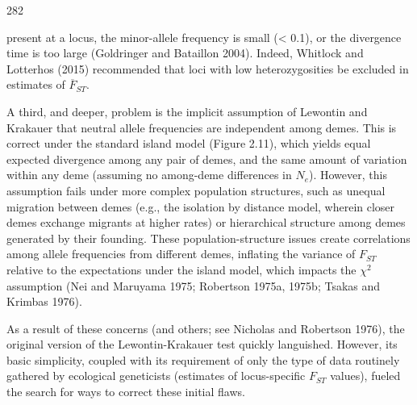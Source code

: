 \documentclass{article}
\begin{document}
282

present at a locus, the minor-allele frequency is small (< 0.1), or the divergence time is too large (Goldringer and Bataillon 2004). Indeed, Whitlock and Lotterhos (2015) recommended that loci with low heterozygosities be excluded in estimates of  $ \overline{F}_{ST} $.

A third, and deeper, problem is the implicit assumption of Lewontin and Krakauer that neutral allele frequencies are independent among demes. This is correct under the standard island model (Figure 2.11), which yields equal expected divergence among any pair of demes, and the same amount of variation within any deme (assuming no among-deme differences in  $ N_e $). However, this assumption fails under more complex population structures, such as unequal migration between demes (e.g., the isolation by distance model, wherein closer demes exchange migrants at higher rates) or hierarchical structure among demes generated by their founding. These population-structure issues create correlations among allele frequencies from different demes, inflating the variance of  $ F_{ST} $ relative to the expectations under the island model, which impacts the  $ \chi^2 $ assumption (Nei and Maruyama 1975; Robertson 1975a, 1975b; Tsakas and Krimbas 1976).

As a result of these concerns (and others; see Nicholas and Robertson 1976), the original version of the Lewontin-Krakauer test quickly languished. However, its basic simplicity, coupled with its requirement of only the type of data routinely gathered by ecological geneticists (estimates of locus-specific  $ F_{ST} $ values), fueled the search for ways to correct these initial flaws.
\end{document}

